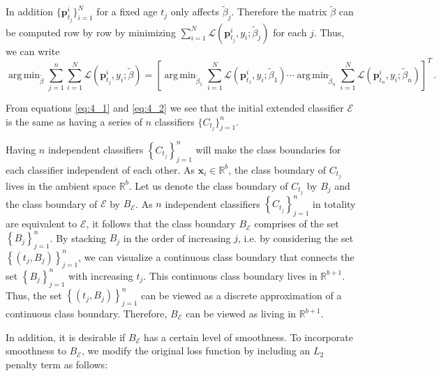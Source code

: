 \documentclass[11pt]{article}
\DeclareMathOperator*{\argmin}{arg\,min}
\begin{document}
	\noindent
	In addition $\{\mathbf{p}^i_{t_j}\}_{i=1}^N$ for a fixed age $t_j$ only affects $\tilde{\beta}_j$. Therefore the matrix $\tilde{\beta} $ can be computed row by row by minimizing  $\sum_{i=1}^N \mathscr{L} \left( \mathbf{p}^i_{t_j},y_i;\tilde{\beta}_j \right)$ for each $j$.  Thus, we can write 
	\begin{equation}\label{eq:4_2}
	  \argmin_{\tilde{\beta}} \sum_{j=1}^n \sum_{i=1}^N  \mathscr{L} \left( \mathbf{p}^i_{t_j},y_i;\tilde{\beta} \right) = \left[\argmin_{\tilde{\beta}_1} \sum_{i=1}^N \mathscr{L} \left( \mathbf{p}^i_{t_1},y_i;\tilde{\beta}_1 \right) \cdots \argmin_{\tilde{\beta}_n} \sum_{i=1}^N \mathscr{L} \left( \mathbf{p}^i_{t_n},y_i;\tilde{\beta}_n \right)   \right]^T \, .
	 \end{equation}

	\noindent
	From equations \eqref{eq:4_1} and \eqref{eq:4_2} we see that the initial extended classifier $\mathscr{E}$  is the same as having a series of $n$ classifiers $\{C_{t_j}\}_{j=1}^n $. 
	
	Having $n$ independent classifiers $\left\{C_{t_j}\right\}_{j=1}^n $ will make the class boundaries for each classifier independent of each other. As $\mathbf{x}_i \in  \mathbb{R}^b$,  the class boundary of $C_{t_j} $ lives in the ambient space $\mathbb{R}^{b}$. Let us denote the class boundary of $C_{t_j}$  by $B_j$ and the class boundary of $\mathscr{E}$ by $B_{\mathscr{E}}$. As $n$ independent classifiers $\left \{C_{t_j} \right \}_{j=1}^n $ in totality are equivalent to $\mathscr{E}$, it follows that the class boundary $ B_{\mathscr{E}} $ comprises of the set  $\left\{ B_j \right\}_{j=1}^n $. By stacking $ B_j  $ in the order of increasing $j$, i.e. by considering the set $\left \{  \left(t_j,  B_j \right) \right \}_{j=1}^n $, we can visualize a continuous class boundary that connects the set $\left\{ B_j \right\}_{j=1}^n $ with increasing $t_j$. This continuous class boundary lives  in $\mathbb{R}^{b+1}$. Thus, the set   $\left \{  \left(t_j,  B_j \right) \right \}_{j=1}^n  $ can be viewed as a discrete approximation of a continuous class boundary. Therefore, $B_{\mathscr{E}}$ can be viewed as living in $\mathbb{R}^{b+1}$. 
	
	
	In addition, it is desirable if $B_{\mathscr{E}}$ has a certain level of smoothness. To incorporate smoothness to $B_{\mathscr{E}}$, we modify the original loss function by including an $L_2$ penalty term as follows:    
	
\end{document}
